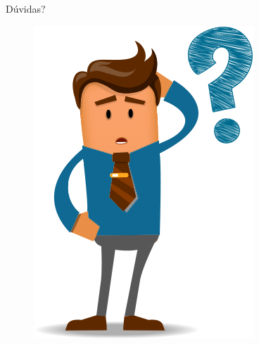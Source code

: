 \documentclass{beamer}
\begin{document}
\begin{frame}{Dúvidas?}
    \begin{figure}
        \includegraphics[scale=0.35]{Theme/Logos/duvidas_frequentes.png}
    \end{figure}
\end{frame}
\end{document}
